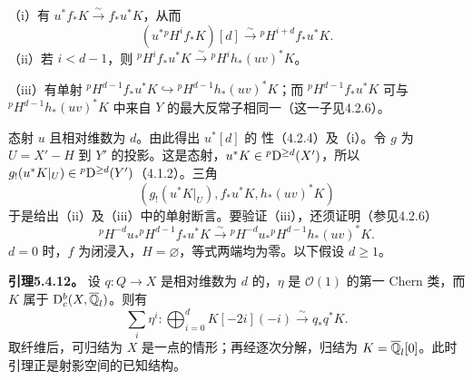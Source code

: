 （i）有 $u^*f_*K\xrightarrow{\sim}f_*u^*K$，从而
\[
(u^*{}^pH^if_*K)[d]\xrightarrow{\sim}{}^pH^{i+d}f_*u^*K.
\]
（ii）若 $i<d-1$，则 ${}^pH^if_*u^*K\xrightarrow{\sim}{}^pH^ih_*(uv)^*K$。

（iii）有单射 ${}^pH^{d-1}f_*u^*K\hookrightarrow{}^pH^{d-1}h_*(uv)^*K$；而 ${}^pH^{d-1}f_*u^*K$ 可与 ${}^pH^{d-1}h_*(uv)^*K$ 中来自 $Y$ 的最大反常子相同一（这一子见4.2.6）。

态射 $u$ 且相对维数为 $d$。由此得出 $u^*[d]$ 的 性（4.2.4）及（i）。令 $g$ 为 $U=X'-H$ 到 $Y'$ 的投影。这是态射，$u^*K\in{}^p\mathrm{D}^{\ge d}(X')$，所以 $g_!(u^*K|_U)\in{}^p\mathrm{D}^{\ge d}(Y')$（4.1.2）。三角
\[
(g_!(u^*K|_U),f_*u^*K,h_*(uv)^*K)
\]
于是给出（ii）及（iii）中的单射断言。要验证（iii），还须证明（参见4.2.6）
\begin{equation*}
{}^pH^{-d}u_*{}^pH^{d-1}f_*u^*K\xrightarrow{\sim}{}^pH^{-d}u_*{}^pH^{d-1}h_*(uv)^*K.\tag{5.4.11.1}
\end{equation*}
$d=0$ 时，$f$ 为闭浸入，$H=\varnothing$，等式两端均为零。以下假设 $d\ge1$。

\par\medskip\noindent\textbf{引理5.4.12。} 设 $q:Q\to X$ 是相对维数为 $d$ 的，$\eta$ 是 $\mathcal O(1)$ 的第一 Chern 类，而 $K$ 属于
$\mathrm{D}_c^b(X,\overline{\mathbb Q}_l)$。则有
\[
\sum_i\eta^i:\bigoplus_{i=0}^dK[-2i](-i)\xrightarrow{\sim}q_*q^*K.
\]
取纤维后，可归结为 $X$ 是一点的情形；再经逐次分解，归结为 $K=\overline{\mathbb Q}_l[0]$。此时引理正是射影空间的已知结构。

